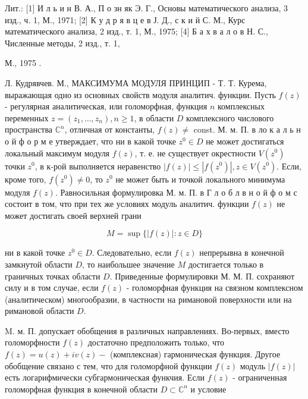 \documentclass[10pt]{article}
\begin{document}
Лит.: [1] И л ь и н В. А., П о зн як Э. Г., Основы математического анализа, 3 изд., ч. 1, М., 1971; [2] К у д р я в ц е в Ј. Д., с к и й С. М., Курс математического анализа, 2 изд., т. 1, М., 1975; [4] Б а х в а л о в Н. С., Численные методы, 2 изд., т. 1,

М., 1975 .

Л. Кудрявчев. М., МАКСИМУМА МОДУЛЯ ПРИНЦИП - Т. Т. Курема, выражающая одно из основных свойств модуля аналитич. функции. Пусть $f(z)$ - регулярная аналитическая, или голоморфная, функция $n$ комплексных переменных $z=\left(z_{1}, \ldots, z_{n}\right), n \geqslant 1$, в области $D$ комплексного числового пространства $\mathbb{C}^{n}$, отличная от константы, $f(z) \neq$ const. М. м. П. в ло к а л ь н о й ф о р м е утверждает, что ни в какой точке $z^{0} \in D$ не может достигаться локальный максимум модуля $f(z)$, т. е. не существует окрестности $V\left(z^{0}\right)$ точки $z^{0}$, в к-рой выполняется неравенство $|f(z)| \leqslant\left|f\left(z^{0}\right)\right|, z \in V\left(z^{0}\right)$. Если, кроме того, $f\left(z^{0}\right) \neq 0$, то $z^{0}$ не может быть и точкой локального минимума модуля $f(z)$. Равносильная формулировка М. м. П. в Г л о б л в н о й ф о м с состоит в том, что при тех же условиях модуль аналитич. функции $f(z)$ не может достигать своей верхней грани



\[

M=\sup \{|f(z)|: z \in D\}

\]



ни в какой точке $z^{0} \in D$. Следовательно, если $f(z)$ непрерывна в конечной замкнутой области $D$, то наибольшее значение $M$ достигается только в граничных точках области $D$. Приведенные формулировки М. М. П. сохраняют силу и в том случае, если $f(z)$ - голоморфная функция на связном комплексном (аналитическом) многообразии, в частности на римановой поверхности или на римановой области $D$.



M. м. П. допускает обобщения в различных направлениях. Во-первых, вместо голоморфности $f(z)$ достаточно предположить только, что $f(z)=u(z)+i v(z)-$ (комплексная) гармоническая функция. Другое обобщение связано с тем, что для голоморфной функции $f(z)$ модуль $|f(z)|$ есть логарифмически субгармоническая функчия. Если $f(z)$ - ограниченная голоморфная функция в конечной области $D \subset \mathbb{C}^{n}$ и условие
\end{document}
